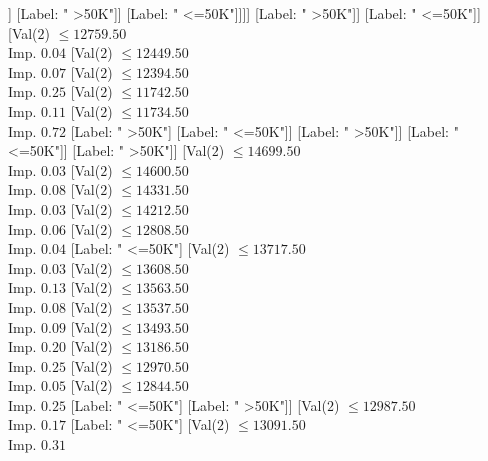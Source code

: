 \documentclass[margin=10pt]{standalone}
\begin{document}
\begin{forest}
																					[Label: " >50K"]
																					[Label: " <=50K"]]
																				[Label: " >50K"]]
																			[Label: " <=50K"]]]]
																[Label: " >50K"]]
															[Label: " <=50K"]]
														[Val($2$) $ \leq 12759.50$ \\ Imp. $0.04$
															[Val($2$) $ \leq 12449.50$ \\ Imp. $0.07$
																[Val($2$) $ \leq 12394.50$ \\ Imp. $0.25$
																	[Val($2$) $ \leq 11742.50$ \\ Imp. $0.11$
																		[Val($2$) $ \leq 11734.50$ \\ Imp. $0.72$
																			[Label: " >50K"]
																			[Label: " <=50K"]]
																		[Label: " >50K"]]
																	[Label: " <=50K"]]
																[Label: " >50K"]]
															[Val($2$) $ \leq 14699.50$ \\ Imp. $0.03$
																[Val($2$) $ \leq 14600.50$ \\ Imp. $0.08$
																	[Val($2$) $ \leq 14331.50$ \\ Imp. $0.03$
																		[Val($2$) $ \leq 14212.50$ \\ Imp. $0.06$
																			[Val($2$) $ \leq 12808.50$ \\ Imp. $0.04$
																				[Label: " <=50K"]
																				[Val($2$) $ \leq 13717.50$ \\ Imp. $0.03$
																					[Val($2$) $ \leq 13608.50$ \\ Imp. $0.13$
																						[Val($2$) $ \leq 13563.50$ \\ Imp. $0.08$
																							[Val($2$) $ \leq 13537.50$ \\ Imp. $0.09$
																								[Val($2$) $ \leq 13493.50$ \\ Imp. $0.20$
																									[Val($2$) $ \leq 13186.50$ \\ Imp. $0.25$
																										[Val($2$) $ \leq 12970.50$ \\ Imp. $0.05$
																											[Val($2$) $ \leq 12844.50$ \\ Imp. $0.25$
																												[Label: " <=50K"]
																												[Label: " >50K"]]
																											[Val($2$) $ \leq 12987.50$ \\ Imp. $0.17$
																												[Label: " <=50K"]
																												[Val($2$) $ \leq 13091.50$ \\ Imp. $0.31$

\end{forest}
\end{document}
